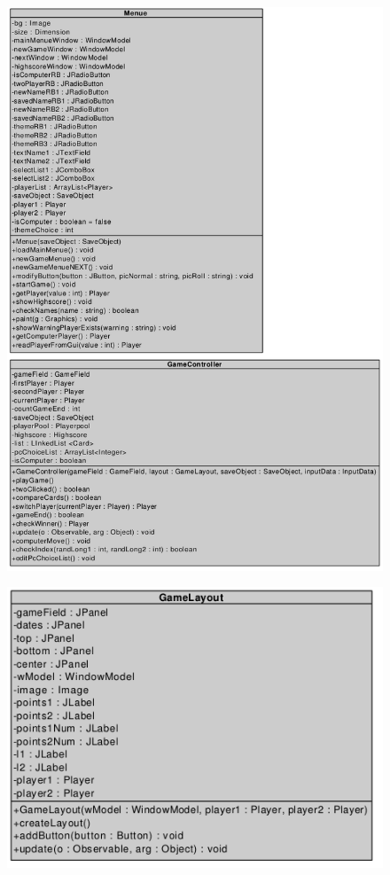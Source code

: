 \begin{figure}[!h]
	\centering
    \includegraphics[width=\textwidth]{./Klassendiagramm2.png}
	\label{layout_gesamt}
\end{figure}

\begin{figure}[!h]
	\centering
    \includegraphics[width=\textwidth]{./Klassendiagramm3.png}
	\label{layout_gesamt}
\end{figure}






